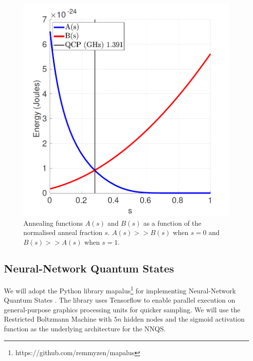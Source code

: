 \begin{figure}[htb!]
    \centering
    \includegraphics[width=0.5\linewidth]{images/dwave_annealing.png}
    \caption[Annealing functions $A(s)$ and $B(s)$ as a function of the normalised anneal fraction $s$. $A(s) >> B(s)$ when $s=0$ and $B(s) >> A(s)$ when $s=1$.]{Annealing functions $A(s)$ and $B(s)$ as a function of the normalised anneal fraction $s$. $A(s) >> B(s)$ when $s=0$ and $B(s) >> A(s)$ when $s=1$. ~\protect\cite{dwaveadvantage}}
    \label{dwaveannealing}
\end{figure}

\subsection{Neural-Network Quantum States}
We will adopt the Python library mapalus\footnote{https://github.com/remmyzen/mapalus} for implementing Neural-Network Quantum States \cite{b25}. The library uses Tensorflow to enable parallel execution on general-purpose graphics processing units for quicker sampling. We will use the Restricted Boltzmann Machine with $5n$ hidden nodes and the sigmoid activation function as the underlying architecture for the NNQS.

